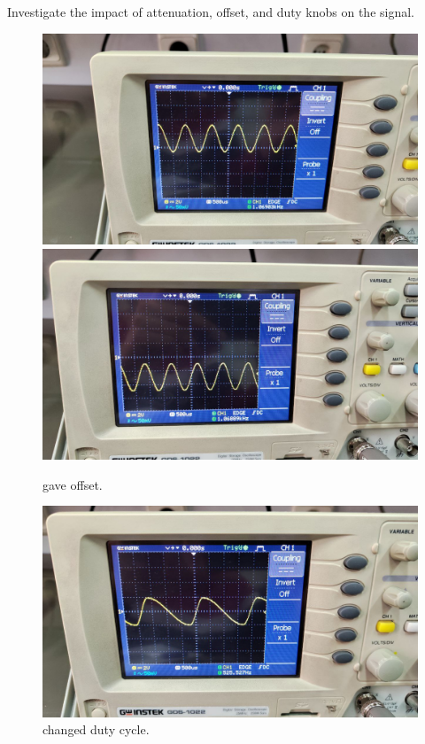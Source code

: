 \documentclass[11pt]{article}
\newcommand{\PicScale}{0.2}
\begin{document}
\begin{question}
\begin{subquestion}{Investigate the impact of attenuation, offset, and duty knobs on the signal.}
{    \begin{figure}[H]
        \begin{center}
            \includegraphics[scale=0.1]{Fig/4.jpeg}
            \includegraphics[scale=0.1]{Fig/5.jpeg}
            \caption{gave offset.}
        \end{center}
    \end{figure}

    \begin{figure}[H]
        \begin{center}
            \includegraphics[scale=\PicScale]{Fig/6.jpeg}
            \caption{changed duty cycle.}
        \end{center}
    \end{figure}
}
\end{subquestion}


\end{question}
\end{document}
